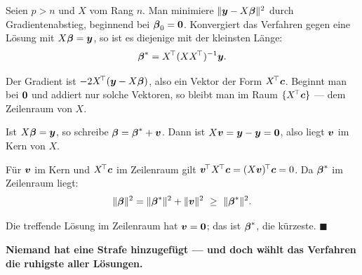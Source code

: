 \begin{merksatz}
Seien $p > n$ und $X$ vom Rang $n$. Man minimiere $\|\boldsymbol{y} - X\boldsymbol{\beta}\|^{2}$ durch Gradientenabstieg, beginnend bei $\boldsymbol{\beta}_0 = \boldsymbol{0}$. Konvergiert das Verfahren gegen eine Lösung mit $X\boldsymbol{\beta} = \boldsymbol{y}$, so ist es diejenige mit der kleinsten Länge:
\[ \boldsymbol{\beta}^{*} = X^{\!\top}(XX^{\!\top})^{-1}\boldsymbol{y} . \]

 Der Gradient ist $-2X^{\!\top}(\boldsymbol{y} - X\boldsymbol{\beta})$, also ein Vektor der Form $X^{\!\top}\boldsymbol{c}$. Beginnt man bei $\boldsymbol{0}$ und addiert nur solche Vektoren, so bleibt man im Raum $\{X^{\!\top}\boldsymbol{c}\}$ --- dem Zeilenraum von $X$.

 Ist $X\boldsymbol{\beta} = \boldsymbol{y}$, so schreibe $\boldsymbol{\beta} = \boldsymbol{\beta}^{*} + \boldsymbol{v}$. Dann ist $X\boldsymbol{v} = \boldsymbol{y} - \boldsymbol{y} = \boldsymbol{0}$, also liegt $\boldsymbol{v}$ im Kern von $X$.

 Für $\boldsymbol{v}$ im Kern und $X^{\!\top}\boldsymbol{c}$ im Zeilenraum gilt $\boldsymbol{v}^{\!\top}X^{\!\top}\boldsymbol{c} = (X\boldsymbol{v})^{\!\top}\boldsymbol{c} = 0$. Da $\boldsymbol{\beta}^{*}$ im Zeilenraum liegt:
\[ \|\boldsymbol{\beta}\|^{2} = \|\boldsymbol{\beta}^{*}\|^{2} + \|\boldsymbol{v}\|^{2} \ \ge\ \|\boldsymbol{\beta}^{*}\|^{2} . \]

 Die treffende Lösung im Zeilenraum hat $\boldsymbol{v} = \boldsymbol{0}$; das ist $\boldsymbol{\beta}^{*}$, die kürzeste. $\blacksquare$

\begin{center}
\begin{minipage}{0.9\textwidth}
\textbf{Niemand hat eine Strafe hinzugefügt --- und doch wählt das Verfahren die ruhigste aller Lösungen.}
\end{minipage}
\end{center}

\begin{center}
\begin{minipage}{0.88\textwidth}
\end{minipage}
\end{center}


\end{merksatz}
